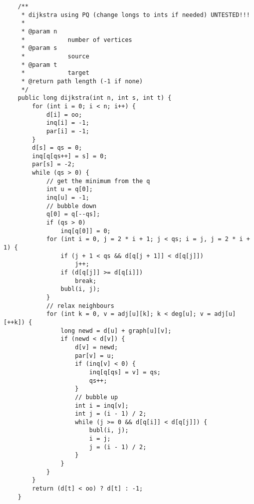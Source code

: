 \documentclass{article}
\begin{document}
    \begin{verbatim}
    /**
     * dijkstra using PQ (change longs to ints if needed) UNTESTED!!!
     * 
     * @param n
     *            number of vertices
     * @param s
     *            source
     * @param t
     *            target
     * @return path length (-1 if none)
     */
    public long dijkstra(int n, int s, int t) {
        for (int i = 0; i < n; i++) {
            d[i] = oo;
            inq[i] = -1;
            par[i] = -1;
        }
        d[s] = qs = 0;
        inq[q[qs++] = s] = 0;
        par[s] = -2;
        while (qs > 0) {
            // get the minimum from the q
            int u = q[0];
            inq[u] = -1;
            // bubble down
            q[0] = q[--qs];
            if (qs > 0)
                inq[q[0]] = 0;
            for (int i = 0, j = 2 * i + 1; j < qs; i = j, j = 2 * i + 1) {
                if (j + 1 < qs && d[q[j + 1]] < d[q[j]])
                    j++;
                if (d[q[j]] >= d[q[i]])
                    break;
                bubl(i, j);
            }
            // relax neighbours
            for (int k = 0, v = adj[u][k]; k < deg[u]; v = adj[u][++k]) {
                long newd = d[u] + graph[u][v];
                if (newd < d[v]) {
                    d[v] = newd;
                    par[v] = u;
                    if (inq[v] < 0) {
                        inq[q[qs] = v] = qs;
                        qs++;
                    }
                    // bubble up
                    int i = inq[v];
                    int j = (i - 1) / 2;
                    while (j >= 0 && d[q[i]] < d[q[j]]) {
                        bubl(i, j);
                        i = j;
                        j = (i - 1) / 2;
                    }
                }
            }
        }
        return (d[t] < oo) ? d[t] : -1;
    }

    \end{verbatim}
\end{document}
